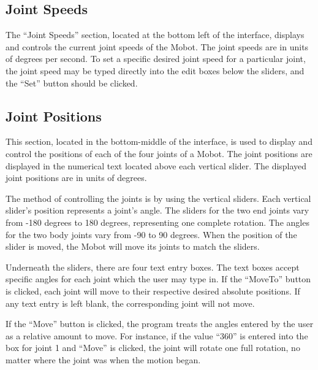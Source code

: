 \documentclass{article}
\begin{document}
\subsection{Joint Speeds}
The ``Joint Speeds'' section, located at the bottom left of the interface,
displays and controls the current joint speeds of the Mobot.
The joint speeds are in units of degrees per second. To set a specific 
desired joint speed for a particular joint, the joint speed may be 
typed directly into the edit boxes below the sliders, and the ``Set''
button should be clicked.
 
\subsection{Joint Positions}
This section, located in the bottom-middle of the interface, is used to display
and control the positions of each of the four
joints of a Mobot. The joint positions are displayed in the numerical
text located above each vertical slider. The displayed joint positions are in
units of degrees.  

The method of controlling the joints is by using the vertical sliders.
Each vertical slider's position represents a joint's angle. The sliders for the
two end joints vary from -180 degrees to 180 degrees, representing one complete
rotation. The angles for the two body joints vary from -90 to 90 degrees. When
the position of the slider is moved, the Mobot will move its joints to match the 
sliders. 

Underneath the sliders, there are four text entry boxes. The text boxes
accept specific angles for each joint which the user may type in. If 
the ``MoveTo'' button is clicked, each joint will move to their respective 
desired absolute positions. If any text entry is left blank, the corresponding joint will
not move. 

If the ``Move'' button is clicked, the program treats the angles entered by the
user as a relative amount to move. For instance, if the value ``360'' is entered
into the box for joint 1 and ``Move'' is clicked, the joint will rotate one full
rotation, no matter where the joint was when the motion began.

\end{document}
